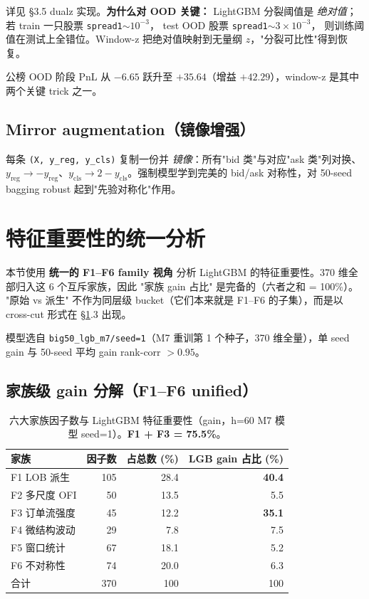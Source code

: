 \documentclass[10.5pt,a4paper]{article}
\begin{document}
详见 §3.5 dualz 实现。\textbf{为什么对 OOD 关键：}
LightGBM 分裂阈值是 \emph{绝对值}；若 train 一只股票 \texttt{spread1}$\sim 10^{-3}$，
test OOD 股票 \texttt{spread1}$\sim 3{\times}10^{-3}$，
则训练阈值在测试上全错位。Window-z 把绝对值映射到无量纲 $z$，"分裂可比性"得到恢复。

公榜 OOD 阶段 PnL 从 $-6.65$ 跃升至 $+35.64$（增益 $+42.29$），window-z 是其中两个关键 trick 之一。

\subsection{Mirror augmentation（镜像增强）}

每条 \texttt{(X, y\_reg, y\_cls)} 复制一份并 \emph{镜像}：所有"bid 类"与对应"ask 类"列对换、$y_{\mathrm{reg}}\to -y_{\mathrm{reg}}$、$y_{\mathrm{cls}}\to 2-y_{\mathrm{cls}}$。强制模型学到完美的 bid/ask 对称性，对 50-seed bagging robust 起到"先验对称化"作用。

\section{特征重要性的统一分析}
\label{sec:imp}

本节使用 \textbf{统一的 F1--F6 family 视角} 分析 LightGBM 的特征重要性。370 维全部归入这 6 个互斥家族，因此 "家族 gain 占比" 是完备的（六者之和 = 100\%）。
"原始 vs 派生" 不作为同层级 bucket（它们本来就是 F1--F6 的子集），而是以 cross-cut 形式在 §\ref{sec:imp}.3 出现。

模型选自 \texttt{big50\_lgb\_m7/seed=1}（M7 重训第 1 个种子，370 维全量），单 seed gain 与 50-seed 平均 gain rank-corr $>0.95$。

\subsection{家族级 gain 分解（F1--F6 unified）}

\begin{table}[H]
\centering
\small
\begin{tabular}{lrrr}
\toprule
家族 & 因子数 & 占总数 (\%) & LGB gain 占比 (\%) \\
\midrule
F1 LOB 派生        & 105 & 28.4 & \textbf{40.4} \\
F2 多尺度 OFI      &  50 & 13.5 &  5.5 \\
F3 订单流强度      &  45 & 12.2 & \textbf{35.1} \\
F4 微结构波动      &  29 &  7.8 &  7.5 \\
F5 窗口统计        &  67 & 18.1 &  5.2 \\
F6 不对称性        &  74 & 20.0 &  6.3 \\
\midrule
合计               & 370 & 100  & 100  \\
\bottomrule
\end{tabular}
\caption{六大家族因子数与 LightGBM 特征重要性（gain，h=60 M7 模型 seed=1）。\textbf{F1 + F3 = 75.5\%}。}
\end{table}
\end{document}

